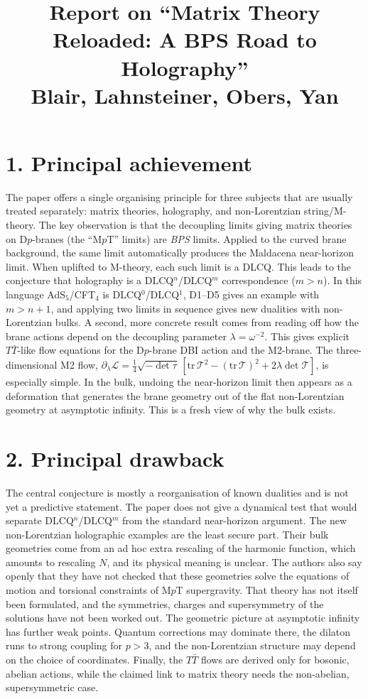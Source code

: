 \documentclass[11pt]{article}
\title{Report on ``Matrix Theory Reloaded: A BPS Road to Holography''\\
\small Blair, Lahnsteiner, Obers, Yan}
\date{}
\begin{document}
\maketitle

\section*{1. Principal achievement}
The paper offers a single organising principle for three subjects that are
usually treated separately: matrix theories, holography, and non-Lorentzian
string/M-theory. The key observation is that the decoupling limits giving
matrix theories on D$p$-branes (the ``M$p$T'' limits) are \emph{BPS} limits.
Applied to the curved brane background, the same limit automatically produces
the Maldacena near-horizon limit. When uplifted to M-theory, each such limit is
a DLCQ. This leads to the conjecture that holography is a
DLCQ$^n$/DLCQ$^m$ correspondence ($m>n$). In this language AdS$_5$/CFT$_4$ is
DLCQ$^0$/DLCQ$^1$, D1--D5 gives an example with $m>n+1$, and applying two
limits in sequence gives new dualities with non-Lorentzian bulks. A second,
more concrete result comes from reading off how the brane actions depend on the
decoupling parameter $\lambda=\omega^{-2}$. This gives explicit $T\bar T$-like
flow equations for the D$p$-brane DBI action and the M2-brane. The
three-dimensional M2 flow,
$\partial_\lambda\mathcal{L}=\tfrac14\sqrt{-\det\tau}\,[\mathrm{tr}\,\mathcal{T}^2-(\mathrm{tr}\,\mathcal{T})^2+2\lambda\det\mathcal{T}]$,
is especially simple. In the bulk, undoing the near-horizon limit then appears
as a deformation that generates the brane geometry out of the flat
non-Lorentzian geometry at asymptotic infinity. This is a fresh view of why the
bulk exists.

\section*{2. Principal drawback}
The central conjecture is mostly a reorganisation of known dualities and is not
yet a predictive statement. The paper does not give a dynamical test that would
separate DLCQ$^n$/DLCQ$^m$ from the standard near-horizon argument. The new
non-Lorentzian holographic examples are the least secure part. Their bulk
geometries come from an ad hoc extra rescaling of the harmonic function, which
amounts to rescaling $N$, and its physical meaning is unclear. The authors
also say openly that they have not checked that these geometries solve the
equations of motion and torsional constraints of M$p$T supergravity. That
theory has not itself been formulated, and the symmetries, charges and
supersymmetry of the solutions have not been worked out. The geometric picture
at asymptotic infinity has further weak points. Quantum corrections may
dominate there, the dilaton runs to strong coupling for $p>3$, and the
non-Lorentzian structure may depend on the choice of coordinates. Finally, the
$T\bar T$ flows are derived only for bosonic, abelian actions, while the claimed
link to matrix theory needs the non-abelian, supersymmetric case.
\end{document}
